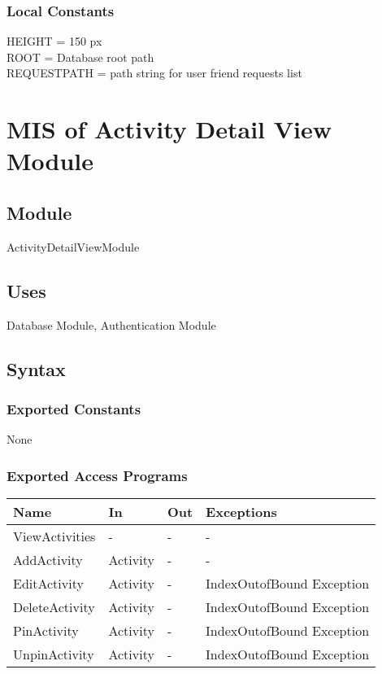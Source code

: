 \documentclass[12pt, titlepage]{article}
\begin{document}
\subsubsection{Local Constants}
HEIGHT = 150 px\\
ROOT = Database root path\\
REQUESTPATH = path string for user friend requests list

\newpage

\section{MIS of Activity Detail View Module} \label{mADV}

\subsection{Module}

ActivityDetailViewModule

\subsection{Uses}

Database Module, Authentication Module

\subsection{Syntax}

\subsubsection{Exported Constants}

None

\subsubsection{Exported Access Programs}
\begin{center}
\begin{tabular}{p{4cm} p{2cm} p{4cm} p{4cm}}
\hline
\textbf{Name} & \textbf{In} & \textbf{Out} & \textbf{Exceptions} \\
\hline
ViewActivities & - & - & - \\
AddActivity & Activity & - & - \\
EditActivity & Activity & - & IndexOutofBound Exception \\
DeleteActivity & Activity & - & IndexOutofBound Exception \\
PinActivity & Activity & - & IndexOutofBound Exception \\
UnpinActivity & Activity & - & IndexOutofBound Exception \\
\hline
\end{tabular}
\end{center}
\end{document}
